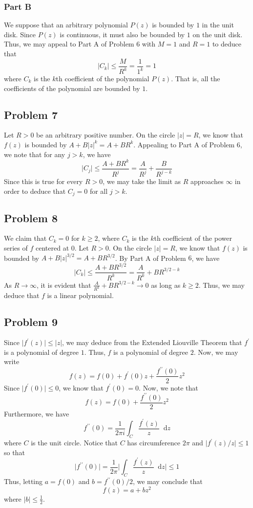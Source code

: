 \documentclass[12pt]{article}
\newcommand*\diff{\mathop{}\!\mathrm{d}}
\begin{document}
\subsubsection*{Part B}
We suppose that an arbitrary polynomial $P(z)$ is bounded by $1$ in the unit disk. Since $P(z)$ is continuous, it must also be bounded by $1$ on the unit disk. Thus, we may appeal to Part A of Problem $6$ with $M = 1$ and $R = 1$ to deduce that
\[
\vert C_k \vert \leq \frac{M}{R^k} = \frac{1}{1^k} = 1
\] where $C_k$ is the $k$th coefficient of the polynomial $P(z)$. That is, all the coefficients of the polynomial are bounded by $1$.
\newpage
\subsection*{Problem 7}
Let $R > 0$ be an arbitrary positive number. On the circle $\vert z \vert = R$, we know that $f(z)$ is bounded by $A+B \vert z \vert^k = A + B R^k$. Appealing to Part A of Problem $6$, we note that for any $j > k$, we have
\[
\vert C_j \vert \leq \frac{A + B R^k}{R^j} = \frac{A}{R^j} + \frac{B}{R^{j-k}}
\] Since this is true for every $R > 0$, we may take the limit as $R$ approaches $\infty$ in order to deduce that $C_j = 0$ for all $j > k$.
\newpage
\subsection*{Problem 8}
We claim that $C_k = 0$ for $k \geq 2$, where $C_k$ is the $k$th coefficient of the power series of $f$ centered at $0$. Let $R > 0$. On the circle $\vert z \vert = R$, we know that $f(z)$ is bounded by $A + B \vert z \vert^{3/2} = A + BR^{3/2}$. By Part A of Problem $6$, we have
\[
\vert C_k \vert \leq \frac{A+BR^{3/2}}{R^k} = \frac{A}{R^k} + BR^{3/2-k}
\] As $R \rightarrow \infty$, it is evident that $\frac{A}{R^k} + BR^{3/2-k} \rightarrow 0$ as long as $k \geq 2$. Thus, we may deduce that $f$ is a linear polynomial.
\newpage
\subsection*{Problem 9}
Since $\vert f^\prime(z) \vert \leq \vert z \vert$, we may deduce from the Extended Liouville Theorem that $f^\prime$ is a polynomial of degree $1$. Thus, $f$ is a polynomial of degree $2$. Now, we may write
\[
f(z) = f(0) + f^\prime(0)z + \frac{f^{\prime\prime}(0)}{2}z^2
\] Since $\vert f^\prime(0) \vert \leq 0$, we know that $f^\prime(0) = 0$. Now, we note that
\[
f(z) = f(0) + \frac{f^{\prime\prime}(0)}{2} z^2
\] Furthermore, we have
\[
 f^{\prime\prime}(0) = \frac{1}{2\pi i} \int_C \frac{f^\prime(z)}{z} \diff z
\] where $C$ is the unit circle. Notice that $C$ has circumference $2\pi$ and $\vert f^\prime(z)/z \vert \leq 1$ so that
\[
\vert f^{\prime\prime}(0) \vert = \frac{1}{2\pi}  \bigg \vert \int_C  \frac{f^\prime(z)}{z}  \diff z \bigg \vert \leq 1
\] Thus, letting $a = f(0)$ and $b = f^{\prime\prime}(0)/2$, we may conclude that
\[
f(z) = a + bz^2
\] where $\vert b \vert \leq \frac{1}{2}$.
\end{document}
